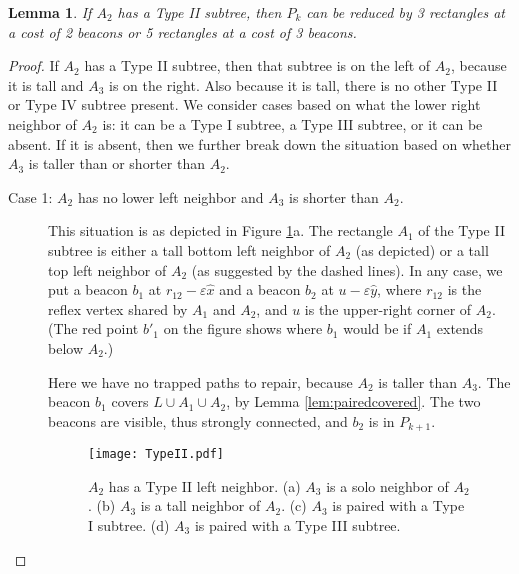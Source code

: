 \documentclass{article}
\newtheorem{lemma}{Lemma}
\begin{document}
		\begin{lemma}\label{lem:typeII}
			If $A_2$ has a Type II subtree, then $P_k$ can be reduced by 3 
			rectangles at a cost of 2 beacons or 5 rectangles at
			a cost of 3 beacons.
		\end{lemma}
		\begin{proof}
			If $A_2$ has a Type II subtree, then that subtree is on the left of $A_2$,
			because it is tall and $A_3$ is on the right.  Also because it is tall, there
			is no other Type II or Type IV subtree present.  We consider cases based on 
			what the lower right neighbor of $A_2$ is: it can be a Type I subtree, a Type
			III subtree, or it can be absent.  If it is absent, then we further break
			down the situation based on whether $A_3$ is taller than or shorter than
			$A_2$.
			
			\begin{description}
			\item[Case 1: $A_2$ has no lower left neighbor and $A_3$ is shorter
			than $A_2$.] 
			
				This situation is as depicted in Figure \ref{fig:typetwo}a. 
				The rectangle $A_1$ of the Type II subtree is either a tall bottom left
				neighbor of $A_2$ (as depicted) or a tall top left neighbor of $A_2$
				(as suggested by the dashed lines).
				In any case, we put a beacon $b_1$ at $r_{12} - \varepsilon\hat{x}$ and a
				beacon $b_2$ at $u - \varepsilon\hat{y}$, where $r_{12}$ is the reflex vertex
				shared by $A_1$ and $A_2$, and $u$ is the upper-right corner of $A_2$.
				(The red point $b'_1$ on the figure shows where $b_1$ would be if $A_1$
				extends below $A_2$.)
				
				Here we have no trapped paths to repair, because $A_2$
				is taller than $A_3$. 
				The beacon $b_1$ covers $L \cup A_1 \cup A_2$, by Lemma
				\ref{lem:pairedcovered}.
				The two beacons are visible, thus strongly connected, and $b_2$ is in
				$P_{k+1}$.
			
				\begin{figure}[htbp] 
					\begin{center}
						\texttt{[image: TypeII.pdf]} 
					\end{center}
					\caption{ $A_2$ has a Type II left neighbor.
						(a) $A_3$ is a solo neighbor of $A_2$.
						(b) $A_3$ is a tall neighbor of $A_2$.
						(c) $A_3$ is paired with a Type I subtree.
						(d) $A_3$ is paired with a Type III subtree.
					}
					\label{fig:typetwo}
				\end{figure}


\end{description}
\end{proof}
\end{document}

